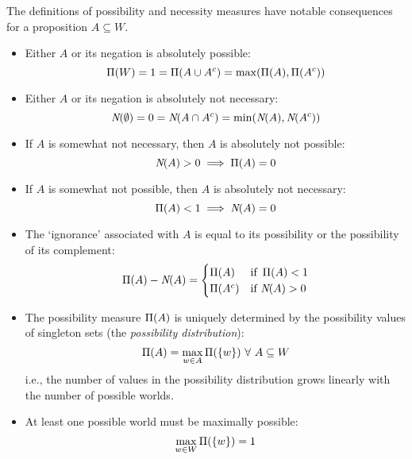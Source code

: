 The definitions of possibility and necessity measures have notable consequences
for a proposition $A \subseteq W$.
\begin{itemize}
  \item Either $A$ or its negation is absolutely possible:
        \begin{equation}
          \operatorname*{\Pi}(W) = 1 = \operatorname*{\Pi}(A \cup A^c) = \max(\operatorname*{\Pi}(A), \operatorname*{\Pi}(A^c))
        \end{equation}
  \item Either $A$ or its negation is absolutely not necessary:
        \begin{equation}
          \textit{N}(\emptyset) = 0 = \textit{N}(A \cap A^c) = \min(\textit{N}(A), \textit{N}(A^c))
        \end{equation}
  \item If $A$ is somewhat not necessary, then $A$ is absolutely not possible:
        \begin{equation}
          \textit{N}(A) > 0 \implies \operatorname*{\Pi}(A) = 0
        \end{equation}
  \item If $A$ is somewhat not possible, then $A$ is absolutely not necessary:
        \begin{equation}
          \operatorname*{\Pi}(A) < 1 \implies \textit{N}(A) = 0
        \end{equation}
  \item The `ignorance' associated with $A$ is equal to its possibility or the
        possibility of its complement:
        \begin{equation}
          \operatorname*{\Pi}(A) - \textit{N}(A) =
          \begin{cases}
            \operatorname*{\Pi}(A)   & \text{if } \operatorname*{\Pi}(A) < 1
            \\
            \operatorname*{\Pi}(A^c) & \text{if } \textit{N}(A) > 0
          \end{cases}
        \end{equation}
  \item The possibility measure $\operatorname*{\Pi}(A)$ is uniquely determined by the
        possibility values of singleton sets (the \emph{possibility distribution}):
        \begin{equation}
          \operatorname*{\Pi}(A) = \max_{w \in A} \operatorname*{\Pi}(\{w\}) \ \forall\ A \subseteq W
        \end{equation}
        i.e., the number of values in the possibility distribution grows
        linearly with the number of possible worlds.
  \item At least one possible world must be maximally possible:
        \begin{equation}
          \max_{w \in W} \operatorname*{\Pi}(\{w\}) = 1
        \end{equation}
\end{itemize}

